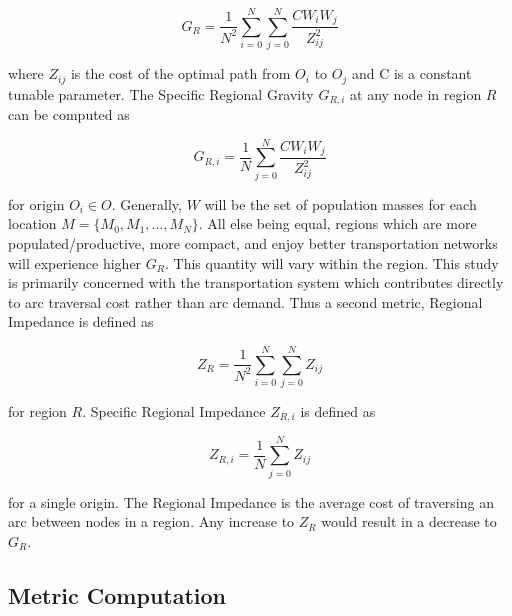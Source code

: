 \begin{equation}
	G_{R} = \frac{1}{N^2}\sum_{i = 0}^{N} \sum_{j = 0 }^{N} \frac{CW_iW_j}{Z_{ij}^2} \label{eq:regional_gravity}
\end{equation}

\noindent where $Z_{ij}$ is the cost of the optimal path from $O_i$ to $O_j$ and C is a constant tunable parameter. The Specific Regional Gravity $G_{R,i}$ at any node in region $R$ can be computed as

\begin{equation}
	G_{R,i} = \frac{1}{N}\sum_{j = 0 }^{N} \frac{CW_iW_j}{Z_{ij}^2} \label{eq:specific_regional_accessibility}
\end{equation}

for origin $O_i \in O$. Generally, $W$ will be the set of population masses for each location $M = \{M_0, M_1, \dots, M_N\}$. All else being equal, regions which are more populated/productive, more compact, and enjoy better transportation networks will experience higher $G_R$. This quantity will vary within the region. This study is primarily concerned with the transportation system which contributes directly to arc traversal cost rather than arc demand. Thus a second metric, Regional Impedance is defined as

\begin{equation}
	Z_{R} = \frac{1}{N^2}\sum_{i = 0}^{N} \sum_{j = 0 }^{N} Z_{ij} \label{eq:regional_impedance}
\end{equation}

for region $R$. Specific Regional Impedance $Z_{R,i}$ is defined as

\begin{equation}
	Z_{R,i} = \frac{1}{N}\sum_{j = 0 }^{N} Z_{ij} \label{eq:specific_regional_impedance}
\end{equation}

for a single origin. The Regional Impedance is the average cost of traversing an arc between nodes in a region. Any increase to $Z_R$ would result in a decrease to $G_R$.

\subsection*{Metric Computation}

